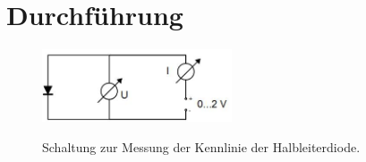 \section{Durchführung} 

\begin{figure}[h]
	\centering
		\includegraphics[width=0.5\textwidth]{Versuch_17-18/Abbildungen/Schaltung_Kennlinie.jpg}
	\label{fig:Schaltung_Kennlinie}
	\caption{Schaltung zur Messung der Kennlinie der Halbleiterdiode.}
\end{figure}

